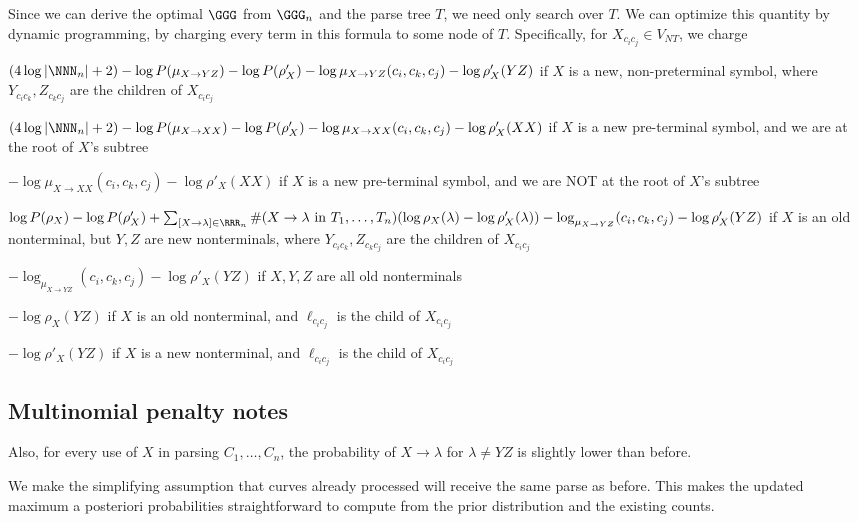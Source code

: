 Since we can derive the optimal $\GGG$ from $\GGG_n$ and the parse
tree $T$, we need only search over $T$. We can optimize this quantity
by dynamic programming, by charging every term in this formula to some
node of $T$. Specifically, for $X_{c_i c_j}\in V_{NT}$, we charge
\bitem
\item $(4\log |\NNN_n| +2) - \log P(\mu_{X\to YZ}) - \log P(\rho'_X)
  -\log \mu_{X\to YZ}(c_i,c_k,c_j) - \log \rho'_X(YZ)$ if $X$ is a new,
  non-preterminal symbol, where $Y_{c_i c_k}, Z_{c_k c_j}$ are the
  children of $X_{c_i c_j}$
\item $(4\log |\NNN_n| +2) - \log P(\mu_{X\to XX}) - \log P(\rho'_X)
  -\log \mu_{X\to XX}(c_i,c_k,c_j) - \log \rho'_X(XX)$ if $X$ is a new
  pre-terminal symbol, and we are at the root of $X$'s subtree
\item $-\log \mu_{X\to XX}(c_i,c_k,c_j) - \log \rho'_X(XX)$ if $X$ is a new
  pre-terminal symbol, and we are NOT at the root of $X$'s subtree
\item $\log P(\rho_X) - \log P(\rho'_X) + \sum_{[X\to \lambda]\in
  \RRR_n} \#(X\to \lambda \text{ in } T_1,\dots, T_n) (\log
  \rho_X(\lambda) - \log \rho'_X(\lambda)) -\log_{\mu_{X\to YZ}} (c_i,
  c_k, c_j) - \log \rho'_X(YZ)$ if $X$ is an old nonterminal, but
  $Y,Z$ are new nonterminals, where $Y_{c_i c_k}, Z_{c_k c_j}$ are the
  children of $X_{c_i c_j}$
\item $ -\log_{\mu_{X\to YZ}} (c_i, c_k, c_j) - \log \rho'_X(YZ)$ if
  $X,Y,Z$ are all old nonterminals
\item $ - \log \rho_X(YZ)$ if
  $X$ is an old nonterminal, and $\ell_{c_i c_j}$ is the child of
  $X_{c_i c_j}$
\item $ - \log \rho'_X(YZ)$ if
  $X$ is a new nonterminal, and $\ell_{c_i c_j}$ is the child of
  $X_{c_i c_j}$
\eitem


\subsection{Multinomial penalty notes}

Also, for every use of $X$ in parsing $C_1, \dots, C_n$, the
probability of $X\to \lambda$ for $\lambda \ne YZ$ is slightly lower
than before.

We make the simplifying assumption that curves already processed will
receive the same parse as before. This makes the updated maximum a
posteriori probabilities straightforward to compute from the prior
distribution and the existing counts.
  

